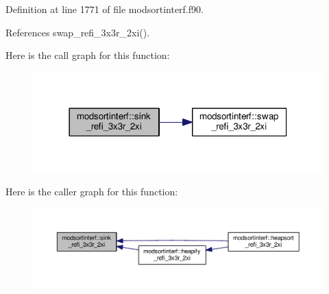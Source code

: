 Definition at line 1771 of file modsortinterf.\-f90.



References swap\-\_\-refi\-\_\-3x3r\-\_\-2xi().



Here is the call graph for this function\-:\nopagebreak
\begin{figure}[H]
\begin{center}
\leavevmode
\includegraphics[width=318pt]{classmodsortinterf_a8ffbe9cb0baeaea314be2e2117d768e6_cgraph}
\end{center}
\end{figure}




Here is the caller graph for this function\-:\nopagebreak
\begin{figure}[H]
\begin{center}
\leavevmode
\includegraphics[width=350pt]{classmodsortinterf_a8ffbe9cb0baeaea314be2e2117d768e6_icgraph}
\end{center}
\end{figure}


